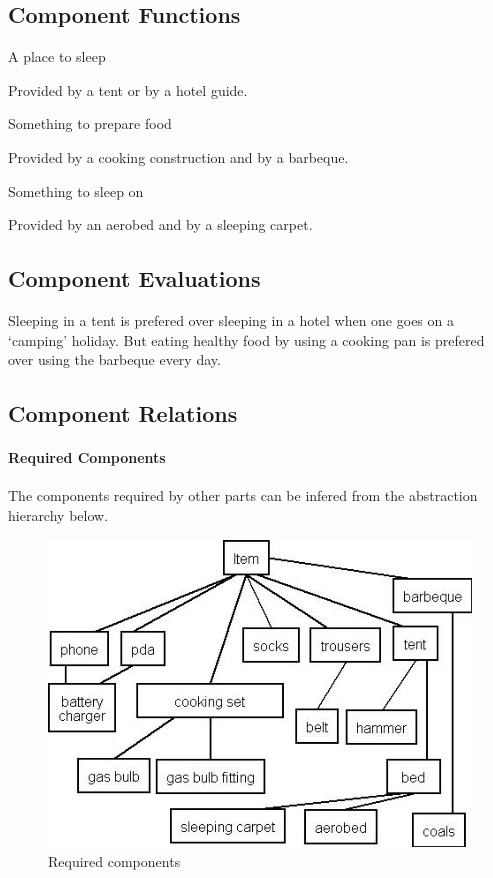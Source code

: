 \documentclass[a4paper,11pt]{article}
\begin{document}
\subsection*{Component Functions}

\begin{description}

\item{A place to sleep}

Provided by a tent or by a hotel guide.

\item{Something to prepare food}

Provided by a cooking construction and by a barbeque.

\item{Something to sleep on}

Provided by an aerobed and by a sleeping carpet.

\end{description}


\subsection*{Component Evaluations}

Sleeping in a tent is prefered over sleeping in a hotel
when one goes on a `camping' holiday. But eating healthy
food by using a cooking pan is prefered over using the
barbeque every day.


\subsection*{Component Relations}

\paragraph{Required Components}

The components required by other parts can be infered from the abstraction 
hierarchy below. 

\begin{figure}
\begin{center}
\includegraphics{subcomponents.jpg}
\end{center}
\caption{Required components}
\label{figuur:RequiredComponents}
\end{figure}
\end{document}
